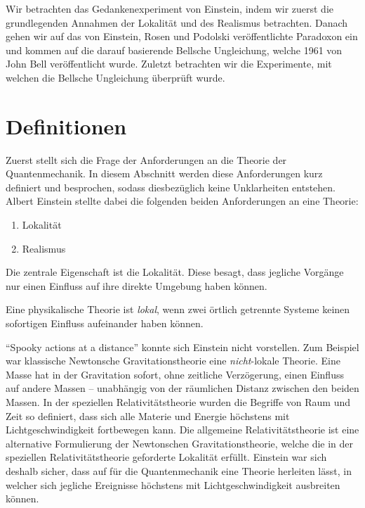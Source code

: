 \begin{refsection}
Wir betrachten das Gedankenexperiment von Einstein, indem wir zuerst die
grundlegenden Annahmen der Lokalit\"at und des Realismus betrachten. Danach
gehen wir auf das von Einstein, Rosen und Podolski ver\"offentlichte Paradoxon
ein und kommen auf die darauf basierende Bellsche Ungleichung, welche
1961 von John Bell ver\"offentlicht wurde.
Zuletzt betrachten wir die Experimente, mit welchen die Bellsche Ungleichung
\"uberpr\"uft wurde.

\section{Definitionen\label{section:bell:definitionen}}
Zuerst stellt sich die Frage der Anforderungen an die Theorie der
Quantenmechanik.
In diesem Abschnitt werden diese Anforderungen kurz definiert und
besprochen, sodass diesbez\"uglich keine Unklarheiten entstehen.
Albert Einstein stellte dabei die folgenden beiden Anforderungen an eine
Theorie:

\begin{enumerate}
    \item Lokalit\"at
    \item Realismus
\end{enumerate}

Die zentrale Eigenschaft ist die Lokalit\"at.
Diese besagt, dass jegliche Vorg\"ange nur einen Einfluss
auf ihre direkte Umgebung haben k\"onnen.

\begin{definition}\label{def:bell:lokalitaet}
    Eine physikalische Theorie ist \emph{lokal}, wenn zwei \"ortlich getrennte
    Systeme keinen sofortigen Einfluss aufeinander haben k\"onnen.
\end{definition}

\foreignquote{english}{Spooky actions at a distance} \cite[S.~158]{Bell:BornEinstein1971}
konnte sich Einstein nicht vorstellen.
Zum Beispiel war klassische Newtonsche Gravitationstheorie
eine \emph{nicht}-lokale Theorie. 
Eine Masse hat in der Gravitation sofort, ohne zeitliche 
Verz\"ogerung, einen Einfluss auf andere Massen -- unabh\"angig von der
r\"aumlichen Distanz zwischen den beiden Massen. 
In der speziellen Relativit\"atstheorie wurden die Begriffe von Raum und Zeit
so definiert, dass sich alle Materie und Energie h\"ochstens mit
Lichtgeschwindigkeit fortbewegen kann. 
Die allgemeine Relativit\"atstheorie ist eine alternative Formulierung
der Newtonschen Gravitationstheorie, welche die in der speziellen
Relativit\"atstheorie geforderte Lokalit\"at erf\"ullt.
Einstein war sich deshalb sicher, dass auf f\"ur die Quantenmechanik eine
Theorie herleiten l\"asst, in welcher sich jegliche Ereignisse h\"ochstens mit
Lichtgeschwindigkeit ausbreiten k\"onnen.


\end{refsection}
